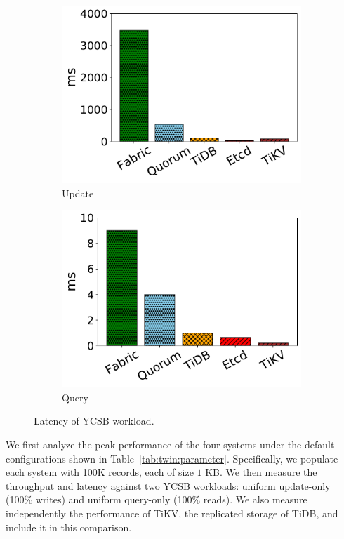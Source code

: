\begin{figure}[tp]
	\centering
	\begin{subfigure}{0.45\textwidth}
		\includegraphics[width=0.99\textwidth]{chart/twin/ycsb-update-delay.pdf}
        \caption{Update}
	\end{subfigure}
	\begin{subfigure}{0.45\textwidth}
		\includegraphics[width=0.99\textwidth]{chart/twin/ycsb-query-delay.pdf}		
        \caption{Query}
	\end{subfigure}
	\caption{Latency of YCSB workload.}
	\label{chart:twin:ycsb-delay}
\end{figure}

We first analyze the peak performance of the four systems under the default
configurations shown in Table~\ref{tab:twin:parameter}.
Specifically, we populate each system with 100K records, each of size $1$ KB.
We then measure the throughput and latency against two YCSB workloads: uniform
update-only (100\% writes) and uniform query-only (100\% reads). We also measure
independently the performance of TiKV, the replicated storage of TiDB, and
include it in this comparison.

